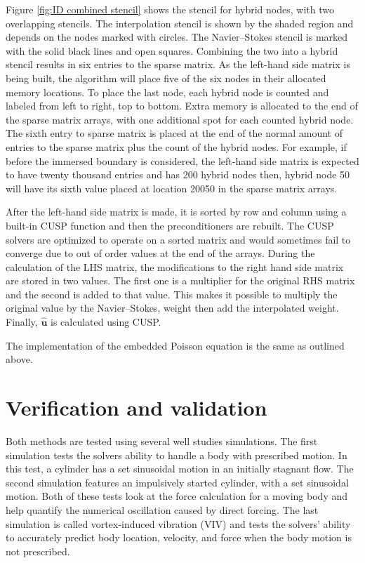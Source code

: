 Figure \ref{fig:ID combined stencil} shows the stencil for hybrid nodes, with two overlapping stencils. 
The interpolation stencil is shown by the shaded region and depends on the nodes marked with circles. 
The Navier--Stokes stencil is marked with the solid black lines and open squares.
Combining the two into a hybrid stencil results in six entries to the sparse matrix. 
As the left-hand side matrix is being built, the algorithm will place five of the six nodes in their allocated memory locations. 
To place the last node, each hybrid node is counted and labeled from left to right, top to bottom. 
Extra memory is allocated to the end of the sparse matrix arrays, with one additional spot for each counted hybrid node. 
The sixth entry to sparse matrix is placed at the end of the normal amount of entries to the sparse matrix plus the count of the hybrid nodes. 
For example, if before the immersed boundary is considered, the left-hand side matrix is expected to have twenty thousand entries and has 200 hybrid nodes then, hybrid node 50 will have its sixth value placed at location 20050 in the sparse matrix arrays. 

After the left-hand side matrix is made, it is sorted by row and column using a built-in CUSP function and then the preconditioners are rebuilt.
The CUSP solvers are optimized to operate on a sorted matrix and would sometimes fail to converge due to out of order values at the end of the arrays.
During the calculation of the LHS matrix, the modifications to the right hand side matrix are stored in two values.
The first one is a multiplier for the original RHS matrix and the second is added to that value.
This makes it possible to multiply the original value by the Navier--Stokes, weight then add the interpolated weight.
Finally, $\hat{\textbf{u}}$ is calculated using CUSP.

The implementation of the embedded Poisson equation is the same as outlined above.

\chapter{Verification and validation}\label{chapter:Validation}
Both methods are tested using several well studies simulations.
The first simulation tests the solvers ability to handle a body with prescribed motion. 
In this test, a cylinder has a set sinusoidal motion in an initially stagnant flow. 
The second simulation features an impulsively started cylinder, with a set sinusoidal motion. 
Both of these tests look at the force calculation for a moving body and help quantify the numerical oscillation caused by direct forcing. 
The last simulation is called vortex-induced vibration (VIV) and tests the solvers' ability to accurately predict body location, velocity, and force when the body motion is not prescribed. 

